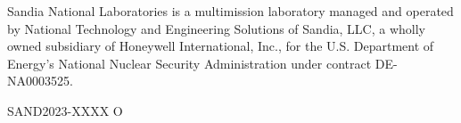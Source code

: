 \documentclass[letterpaper]{scrartcl}
\begin{document}
\vspace*{\fill}
\noindent
Sandia National Laboratories is a multimission laboratory managed and
operated by National Technology and Engineering Solutions of Sandia,
LLC, a wholly owned subsidiary of Honeywell International, Inc., for
the U.S. Department of Energy's National Nuclear Security
Administration under contract DE-NA0003525.

SAND2023-XXXX O
\end{document}
